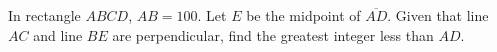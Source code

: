 In rectangle $ ABCD$, $ AB=100$. Let $ E$ be the midpoint of $ \overline{AD}$. Given that line $ AC$ and line $ BE$ are perpendicular, find the greatest integer less than $ AD$.